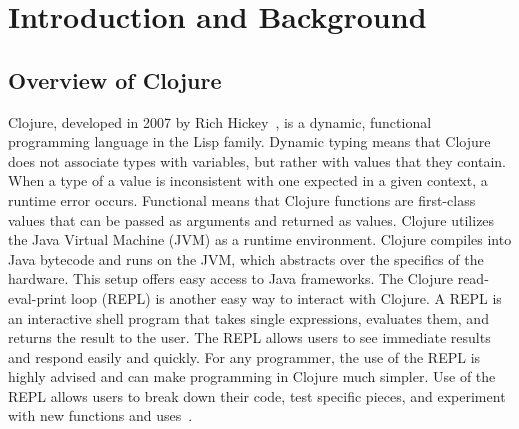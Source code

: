 \documentclass[12pt]{article}
\newcommand{\comment}[1]{{\bf \tt  {#1}}}
\newcommand{\emcomment}[1]{\textcolor{ForestGreen}{\comment{Elena: {#1}}}}
\newcommand{\hfcomment}[1]{\textcolor{Teal}{\comment{Henry: {#1}}}}
\begin{document}
\section{Introduction and Background}\label{sec:intro}
\subsection{Overview of Clojure}\label{sec:clojure}
  
  
Clojure, developed in 2007 by Rich Hickey~\cite{Hickey:2008}, is a dynamic, functional
programming language in the Lisp family.
Dynamic typing means that Clojure does not associate types with variables, but rather with values that they contain.
When a type of a value is inconsistent with one expected in a given context, a runtime error occurs.
Functional means
that Clojure functions are first-class values that can be passed as arguments and returned
as values.
Clojure utilizes the Java Virtual Machine (JVM) as a runtime environment. Clojure compiles into Java bytecode
and runs on the JVM, which abstracts over the specifics of the hardware.
This setup offers easy 
access to Java frameworks. The Clojure read-eval-print loop (REPL)
is another easy way to interact 
 with Clojure. A REPL is an interactive shell program that takes single 
expressions, evaluates them, and returns the result to the user. The REPL allows users to see 
immediate results and respond easily and quickly. For any programmer, the use of the REPL 
is highly advised and can make programming in Clojure much simpler. Use of the REPL allows users
to break down their code, test specific pieces, and experiment with new functions and uses~\cite{clojure-REPL}.
\end{document}

